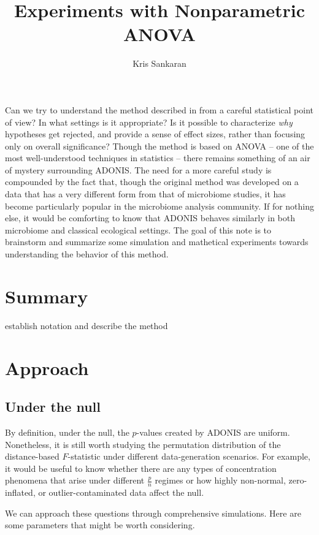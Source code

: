 \documentclass{article}
\title{Experiments with Nonparametric ANOVA}
\author{Kris Sankaran}
\begin{document}
\maketitle

Can we try to understand the method described in \citep{anderson2001new} from a
careful statistical point of view? In what settings is it appropriate? Is it
possible to characterize \textit{why} hypotheses get rejected, and provide a
sense of effect sizes, rather than focusing only on overall significance? Though
the method is based on ANOVA -- one of the most well-understood techniques in
statistics -- there remains something of an air of mystery surrounding ADONIS.
The need for a more careful study is compounded by the fact that, though the
original method was developed on a data that has a very different form from that
of microbiome studies, it has become particularly popular in the microbiome
analysis community. If for nothing else, it would be comforting to know that
ADONIS behaves similarly in both microbiome and classical ecological settings.
The goal of this note is to brainstorm and summarize some simulation and
mathetical experiments towards understanding the behavior of this method.

\section{Summary}

establish notation and describe the method

\section{Approach}

\subsection{Under the null}

By definition, under the null, the $p$-values created by ADONIS are uniform.
Nonetheless, it is still worth studying the permutation distribution of the
distance-based $F$-statistic under different data-generation scenarios. For
example, it would be useful to know whether there are any types of concentration
phenomena that arise under different $\frac{p}{n}$ regimes or how highly
non-normal, zero-inflated, or outlier-contaminated data affect the null.

We can approach these questions through comprehensive simulations. Here are some
parameters that might be worth considering.
\end{document}
